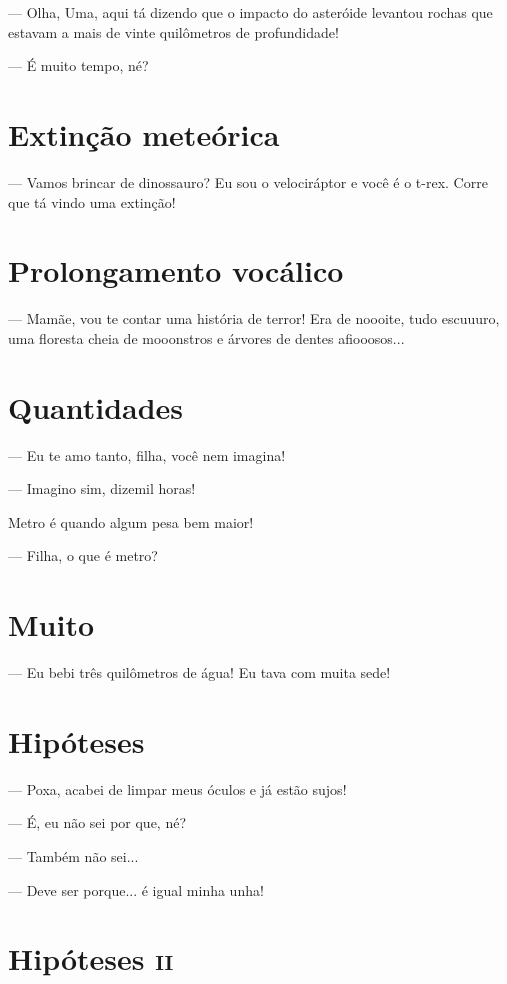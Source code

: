 {— Olha, Uma, aqui tá dizendo que o impacto do asteróide levantou rochas
que estavam a mais de vinte quilômetros de profundidade!

— É muito tempo, né?

\chapter{Extinção meteórica}

— Vamos brincar de dinossauro? Eu sou o velociráptor e você é o t-rex.
Corre que tá vindo uma extinção!

\chapter{Prolongamento vocálico}

— Mamãe, vou te contar uma história de terror! Era de noooite, tudo
escuuuro, uma floresta cheia de mooonstros e árvores de dentes
afiooosos...

\chapter{Quantidades}

— Eu te amo tanto, filha, você nem imagina!

— Imagino sim, dizemil horas!

Metro é quando algum pesa bem maior!

— Filha, o que é metro?

\chapter{Muito}

— Eu bebi três quilômetros de água! Eu tava com muita sede!

\chapter{Hipóteses}

— Poxa, acabei de limpar meus óculos e já estão sujos!

— É, eu não sei por que, né?

— Também não sei...

— Deve ser porque... é igual minha unha!

\chapter{Hipóteses \textsc{ii}}

}
